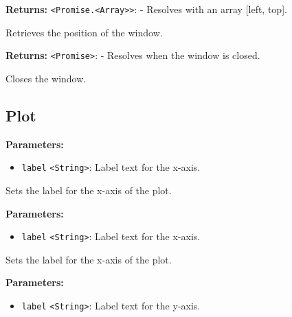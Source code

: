 \documentclass[12pt,a4paper]{article}
\begin{document}
\noindent \textbf{Returns:} \texttt{<Promise.<Array>>}: - Resolves with an array [left, top].

\noindent Retrieves the position of the window.

\vspace{5mm}
\noindent {}


\noindent \textbf{Returns:} \texttt{<Promise>}: - Resolves when the window is closed.

\noindent Closes the window.


\subsection{Plot}
\vspace{5mm}
\noindent {}


\noindent \textbf{Parameters:}
\begin{itemize}
  \item \texttt{label} \texttt{<String>}: Label text for the x-axis.
\end{itemize}

\noindent Sets the label for the x-axis of the plot.

\vspace{5mm}
\noindent {}


\noindent \textbf{Parameters:}
\begin{itemize}
  \item \texttt{label} \texttt{<String>}: Label text for the x-axis.
\end{itemize}

\noindent Sets the label for the x-axis of the plot.

\vspace{5mm}
\noindent {}


\noindent \textbf{Parameters:}
\begin{itemize}
  \item \texttt{label} \texttt{<String>}: Label text for the y-axis.
\end{itemize}
\end{document}
